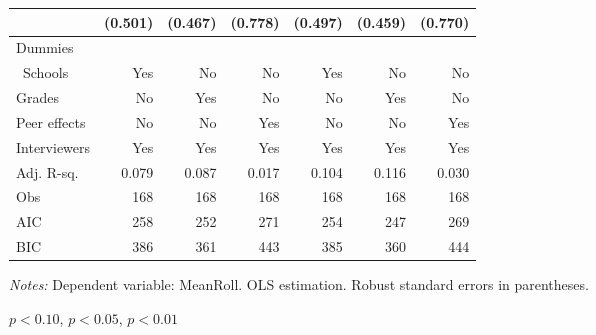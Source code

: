 \begin{table}[htbp]
\begin{adjustbox}{width=1\textwidth}
\begin{threeparttable}
\begin{tabular}{l*{6}{D{.}{.}{-1}}}
                    &             (0.501)   &             (0.467)   &             (0.778)   &             (0.497)   &             (0.459)   &             (0.770)   \\ \midrule
Dummies &&&&& \\\
Schools             &                 Yes   &                  No   &                  No   &                 Yes   &                  No   &                  No   \\
Grades              &                  No   &                 Yes   &                  No   &                  No   &                 Yes   &                  No   \\
Peer effects        &                  No   &                  No   &                 Yes   &                  No   &                  No   &                 Yes   \\
Interviewers        &                 Yes   &                 Yes   &                 Yes   &                 Yes   &                 Yes   &                 Yes   \\
\midrule
Adj. R-sq.          &               0.079   &               0.087   &               0.017   &               0.104   &               0.116   &               0.030   \\
Obs                 &                 168   &                 168   &                 168   &                 168   &                 168   &                 168   \\
AIC                 &                 258   &                 252   &                 271   &                 254   &                 247   &                 269   \\
BIC                 &                 386   &                 361   &                 443   &                 385   &                 360   &                 444   \\
\bottomrule
\end{tabular}
\begin{tablenotes}
\footnotesize
\item \textit{Notes:} Dependent variable: MeanRoll. OLS estimation. Robust standard errors in parentheses.
\item \sym{*} \(p<0.10\), \sym{**} \(p<0.05\), \sym{***} \(p<0.01\)
\end{tablenotes}
\end{threeparttable}
\end{adjustbox}
\label{tab:cheat_tot}
\end{table}
